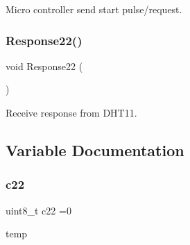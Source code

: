 Micro controller send start pulse/request. 

\mbox{\label{dht22_8c_a27c3a0f45c0abfe89528c6d10b2ebd67}} 
\subsubsection{Response22()}
{\footnotesize\ttfamily void Response22 (\begin{DoxyParamCaption}{ }\end{DoxyParamCaption})}



Receive response from D\+H\+T11. 



\subsection{Variable Documentation}
\mbox{\label{dht22_8c_a0ee711c61ae438b4a5a331ef81f9dea4}} 
\subsubsection{c22}
{\footnotesize\ttfamily uint8\+\_\+t c22 =0}



temp 


